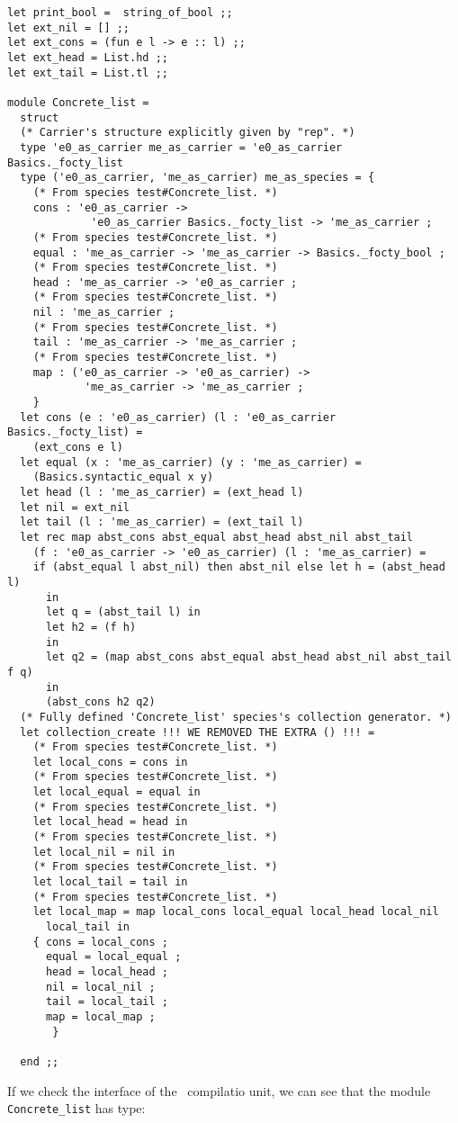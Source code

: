 {\footnotesize
\begin{lstlisting}[language=MyOCaml,
                   emph={WE, REMOVED, THE, EXTRA, ()}, emphstyle=\color{red}]
let print_bool =  string_of_bool ;;
let ext_nil = [] ;;
let ext_cons = (fun e l -> e :: l) ;;
let ext_head = List.hd ;;
let ext_tail = List.tl ;;

module Concrete_list =
  struct
  (* Carrier's structure explicitly given by "rep". *)
  type 'e0_as_carrier me_as_carrier = 'e0_as_carrier Basics._focty_list
  type ('e0_as_carrier, 'me_as_carrier) me_as_species = {
    (* From species test#Concrete_list. *)
    cons : 'e0_as_carrier ->
             'e0_as_carrier Basics._focty_list -> 'me_as_carrier ;
    (* From species test#Concrete_list. *)
    equal : 'me_as_carrier -> 'me_as_carrier -> Basics._focty_bool ;
    (* From species test#Concrete_list. *)
    head : 'me_as_carrier -> 'e0_as_carrier ;
    (* From species test#Concrete_list. *)
    nil : 'me_as_carrier ;
    (* From species test#Concrete_list. *)
    tail : 'me_as_carrier -> 'me_as_carrier ;
    (* From species test#Concrete_list. *)
    map : ('e0_as_carrier -> 'e0_as_carrier) ->
            'me_as_carrier -> 'me_as_carrier ;
    }
  let cons (e : 'e0_as_carrier) (l : 'e0_as_carrier Basics._focty_list) =
    (ext_cons e l)
  let equal (x : 'me_as_carrier) (y : 'me_as_carrier) =
    (Basics.syntactic_equal x y)
  let head (l : 'me_as_carrier) = (ext_head l)
  let nil = ext_nil
  let tail (l : 'me_as_carrier) = (ext_tail l)
  let rec map abst_cons abst_equal abst_head abst_nil abst_tail
    (f : 'e0_as_carrier -> 'e0_as_carrier) (l : 'me_as_carrier) =
    if (abst_equal l abst_nil) then abst_nil else let h = (abst_head l)
      in
      let q = (abst_tail l) in
      let h2 = (f h)
      in
      let q2 = (map abst_cons abst_equal abst_head abst_nil abst_tail f q)
      in
      (abst_cons h2 q2)
  (* Fully defined 'Concrete_list' species's collection generator. *)
  let collection_create !!! WE REMOVED THE EXTRA () !!! =
    (* From species test#Concrete_list. *)
    let local_cons = cons in
    (* From species test#Concrete_list. *)
    let local_equal = equal in
    (* From species test#Concrete_list. *)
    let local_head = head in
    (* From species test#Concrete_list. *)
    let local_nil = nil in
    (* From species test#Concrete_list. *)
    let local_tail = tail in
    (* From species test#Concrete_list. *)
    let local_map = map local_cons local_equal local_head local_nil
      local_tail in
    { cons = local_cons ;
      equal = local_equal ;
      head = local_head ;
      nil = local_nil ;
      tail = local_tail ;
      map = local_map ;
       }
    
  end ;;
\end{lstlisting}
}
If we check the interface of the \ocaml\ compilatio unit, we can see
that the module {\tt Concrete\_list} has type:

